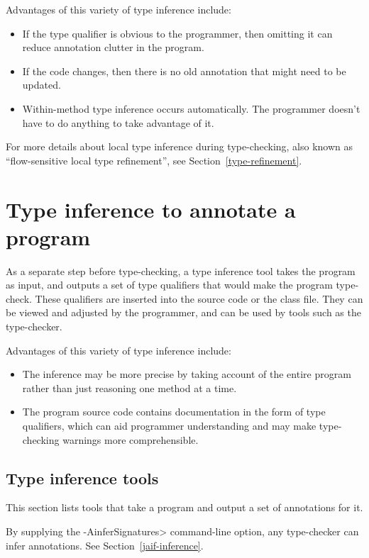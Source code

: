 Advantages of this variety of type inference include:
\begin{itemize}
\item
  If the type qualifier is obvious to the programmer, then omitting it
  can reduce annotation clutter in the program.
\item
  If the code changes, then there is no old annotation that
  might need to be updated.
\item
  Within-method type inference occurs automatically.
  The programmer doesn't have to do anything to take advantage of it.
\end{itemize}

For more details about local type inference during type-checking, also
known as ``flow-sensitive local type refinement'', see
Section~\ref{type-refinement}.


\section{Type inference to annotate a program\label{type-inference-to-annotate}}

As a separate step before type-checking, a type inference tool takes the
program as input, and outputs a set of type qualifiers that would
make the program type-check.
These qualifiers are inserted into the source code or the
class file.  They can be viewed and adjusted by the programmer, and can
be used by tools such as the type-checker.

Advantages of this variety of type inference include:
\begin{itemize}
\item
  The inference may be more precise by taking account of the entire program
  rather than just reasoning one method at a time.
\item
  The program source code contains documentation in the form of type
  qualifiers, which can aid programmer understanding and may make
  type-checking warnings more comprehensible.
\end{itemize}


\subsection{Type inference tools\label{type-inference-tools}}

This section lists tools that take a program and output a set of
annotations for it.

By supplying the \<-AinferSignatures> command-line option,
any type-checker can infer annotations. See Section~\ref{jaif-inference}.

